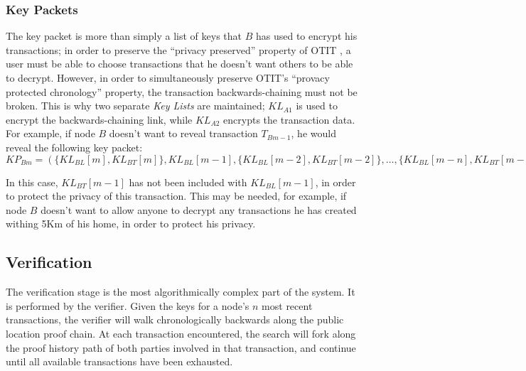 \documentclass[12pt]{article}
\begin{document}
\subsubsection{Key Packets}
The key packet is more than simply a list of keys that $B$ has used to encrypt his transactions; in order to preserve the ``privacy preserved'' property of OTIT \cite{otit}, a user must be able to choose transactions that he doesn't want others to be able to decrypt. However, in order to simultaneously preserve OTIT's ``provacy protected chronology'' property, the transaction backwards-chaining must not be broken. This is why two separate \textit{Key Lists} are maintained; $KL_{A1}$ is used to encrypt the backwards-chaining link, while $KL_{A2}$ encrypts the transaction data. For example, if node $B$ doesn't want to reveal transaction $T_{Bm-1}$, he would reveal the following key packet:
\\

\noindent
$KP_{Bm} = (\{KL_{BL}[m], KL_{BT}[m]\}, KL_{BL}[m-1], \{KL_{BL}[m-2], KL_{BT}[m-2]\}, \ldots, \{KL_{BL}[m-n], KL_{BT}[m-n]\})$

\null
In this case, $KL_{BT}[m-1]$ has not been included with $KL_{BL}[m-1]$, in order to protect the privacy of this transaction. This may be needed, for example, if node $B$ doesn't want to allow anyone to decrypt any transactions he has created withing 5Km of his home, in order to protect his privacy.

\subsection{Verification}
The verification stage is the most algorithmically complex part of the system. It is performed by the verifier. Given the keys for a node's $n$ most recent transactions, the verifier will walk chronologically backwards along the public location proof chain. At each transaction encountered, the search will fork along the proof history path of both parties involved in that transaction, and continue until all available transactions have been exhausted.
\end{document}
